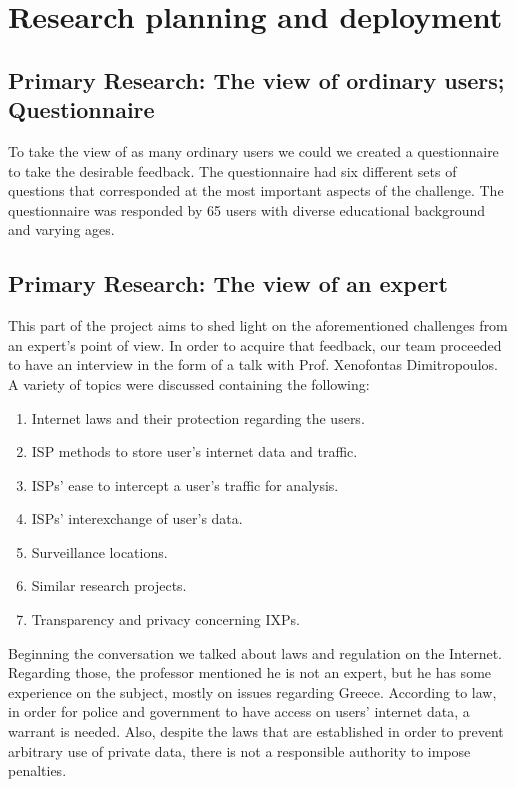 \section{Research planning and deployment}

\subsection{Primary Research: The view of ordinary users; Questionnaire}

To take the view of as many ordinary users we could we created a questionnaire 
to take the desirable feedback. The questionnaire had six different sets of 
questions that corresponded at the most important aspects of the challenge. The 
questionnaire was responded by 65 users with diverse educational background and 
varying ages.

\subsection{Primary Research: The view of an expert}

This part of the project aims to shed light on the aforementioned challenges 
from an expert's point of view. In order to acquire that feedback, our team 
proceeded to have an interview in the form of a talk with Prof. Xenofontas 
Dimitropoulos. A variety of topics were discussed containing the following:
\begin{enumerate}
\item{Internet laws and their protection regarding the users.}
\item{ISP methods to store user's internet data and traffic.}
\item{ISPs' ease to intercept a user's traffic for analysis.}
\item{ISPs' interexchange of user's data.}
\item{Surveillance locations.}
\item{Similar research projects.} 
\item{Transparency and privacy concerning IXPs.}
\end{enumerate}

Beginning the conversation we talked about laws and regulation on the Internet. 
Regarding those, the professor mentioned he is not an expert, but he has some 
experience on the subject, mostly on issues regarding Greece. According to law, 
in order for police and government to have access on users’ internet data, a 
warrant is needed. Also, despite the laws that are established in order to 
prevent arbitrary use of private data, there is not a responsible authority to 
impose penalties.

